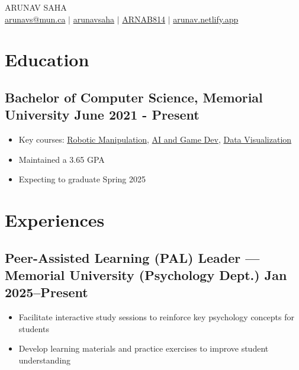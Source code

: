 \documentclass[10pt]{article}
\begin{document}
\begin{center}
    {\fontsize{32}{32}\selectfont\interthin ARUNAV SAHA} \\ \bigskip
    {\color{icnclr}\faEnvelope[regular]} \href{mailto:arunavs@mun.ca}{arunavs@mun.ca} $|$
    {\color{icnclr}\faLinkedinIn} \href{https://www.linkedin.com/in/arunavsaha/}{arunavsaha} $|$
    {\color{icnclr}\faGithub} \href{https://www.github.com/ARNAB814}{ARNAB814} $|$
    {\color{icnclr}\faGlobe} \href{https://arunav.netlify.app}{arunav.netlify.app}
\end{center}

\section{Education}
\subsection{Bachelor of Computer Science, Memorial University \hfill June 2021 - Present}
\begin{itemize}
    \item Key courses: \href{https://www.mun.ca/computerscience/undergraduates/courses/comp-3766-introduction-to-robotic-manipulation/}{Robotic Manipulation}, \href{https://www.mun.ca/computerscience/undergraduates/courses/comp-4303-artificial-intelligence-in-computer-gam/}{AI and Game Dev}, \href{https://www.mun.ca/computerscience/undergraduates/courses/comp-4304-data-visualization/}{Data Visualization}
    \item Maintained a 3.65 GPA
    \item Expecting to graduate Spring 2025
    
\end{itemize}

\section{Experiences}

\subsection{Peer-Assisted Learning (PAL) Leader — Memorial University (Psychology Dept.) \hfill Jan 2025–Present}
\begin{itemize}
    \item Facilitate interactive study sessions to reinforce key psychology concepts for students
    \item Develop learning materials and practice exercises to improve student understanding
\end{itemize}
\end{document}
